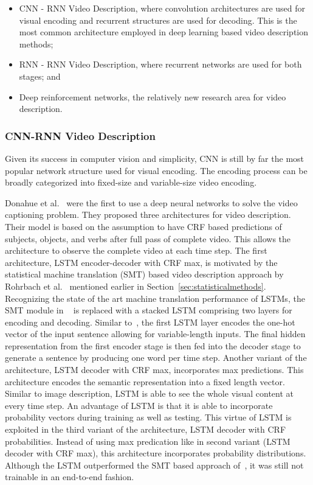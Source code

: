 \documentclass[10pt,journal,compsoc]{IEEEtran}
\begin{document}
\begin{itemize}
\item CNN - RNN Video Description, where convolution architectures are used for visual encoding and recurrent structures are used for decoding. This is the most common architecture employed in deep learning based video description methods; 
\item RNN - RNN Video Description, where recurrent networks are used for both stages; and  
\item Deep reinforcement networks, the relatively new research area for video description.
\end{itemize}

\subsubsection{CNN-RNN Video Description}
Given its success in computer vision and simplicity, CNN is still by far the most popular network structure used for visual encoding. The encoding process can be broadly categorized into fixed-size and variable-size video encoding.

Donahue et al.~\cite{donahue2015long} were the first to use a deep neural networks to solve the video captioning problem. They proposed three architectures for video description. Their model is based on the assumption to have CRF based predictions of subjects, objects, and verbs after full pass of complete video. This allows the architecture to observe the complete video at each time step. The first architecture, LSTM encoder-decoder with CRF max, is motivated by the statistical machine translation (SMT) based video description approach by Rohrbach et al.~\cite{rohrbach2013translating} mentioned earlier in Section~\ref{sec:statisticalmethods}. Recognizing the state of the art machine translation performance of LSTMs, the SMT module in ~\cite{rohrbach2013translating} is replaced with a stacked LSTM comprising two layers for encoding and decoding. Similar to~\cite{sutskever2014sequence}, the first LSTM layer encodes the one-hot vector of the input sentence allowing for variable-length inputs. The final hidden representation from the first encoder stage is then fed into the decoder stage to generate a sentence by producing one word per time step. Another variant of the architecture, LSTM decoder with CRF max, incorporates max predictions. This architecture encodes the semantic representation into a fixed length vector. Similar to image description, LSTM is able to see the whole visual content at every time step. An advantage of LSTM is that it is able to incorporate probability vectors during training as well as testing. This virtue of LSTM is exploited in the third variant of the architecture, LSTM decoder with CRF probabilities. Instead of using max predication like in second variant (LSTM decoder with CRF max), this architecture incorporates probability distributions. Although the LSTM outperformed the SMT based approach of~\cite{rohrbach2013translating}, it was still not trainable in an end-to-end fashion.
\end{document}
